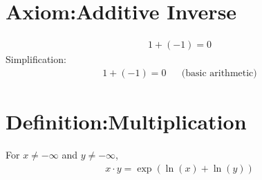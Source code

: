 \documentclass[12pt,a4paper]{report}
\begin{document}
\section{Axiom:Additive Inverse}
\label{Axiom:Additive_Inverse}
\begin{align*}
1 + (-1) = 0
\end{align*}
Simplification:
\begin{align*}
1 + (-1) = 0  && \text{(basic arithmetic)}
\end{align*}

\section{Definition:Multiplication}
\label{Definition:Multiplication}
For $x \neq -\infty$ and $y \neq -\infty$,
\begin{align*}
x \cdot y = \exp(\ln(x) + \ln(y))
\end{align*}
\end{document}
